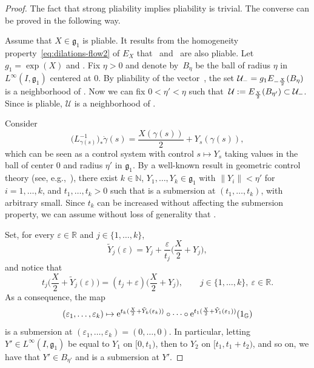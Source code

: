 \documentclass[pdftex]{sigma}
\numberwithin{equation}{section}
\theoremstyle{definition}
\begin{document}
\begin{proof}
 The fact that strong pliability implies pliability is trivial. The converse can be proved in the following way.

Assume that $X\in{\mathfrak g}_1$ is pliable. It results from the homogeneity property~\eqref{eq:dilations-flow2} of $E_X$ that~ and~ are also pliable. Let $g_1=\exp(X)$ and .
Fix $\eta>0$ and denote by~$B_\eta$ be the ball of radius $\eta$ in $L^\infty(I,{\mathfrak g}_1)$ centered at $0$.
By pliability of the vector~, the set
${\mathcal U_-=g_1 \smash{E_{-\frac X2}(B_\eta)}}$ is a neighborhood of .
 Now we can fix $0<\eta'<\eta$ such that~$\mathcal U:=\smash{E_{\frac X2}(B_{\eta'})\subset
 \mathcal U_-}$. Since  is pliable, $\mathcal U$ is a neighborhood of .

 Consider
 \begin{equation*}%
 \bigl(L_{\gamma(s)}^{-1}\bigr)_*\dot\gamma(s)=\frac{X(\gamma(s))}{2}+Y_s(\gamma(s)),
\end{equation*}
 which can be seen as a control system
 with control $s\mapsto Y_s$ taking values in the ball of center $0$ and radius $\eta'$ in ${\mathfrak g}_1$.
 By a well-known result in geometric control theory (see, e.g.,~\cite[Section~3, Theorem~1]{Jurdjevic}),
 there exist $k\in \mathbb{N}$, $Y_1,\dots,Y_k\in {\mathfrak g}_1$ with $\|Y_i\|<\eta'$ for $i=1,\dots,k$, and ${t_1,\dots,t_k>0}$ such that
  is a submersion at $(t_1,\dots,t_k)$, with  arbitrary small. Since $t_k$ can be
 increased without affecting
 the submersion property, we can assume without loss of generality that .

Set, for every $\varepsilon\in \mathbb{R}$ and $j\in\{1,\dots,k\}$,
\[\tilde Y_j(\varepsilon)=Y_j + \frac{\varepsilon}{t_j}\biggl( \frac X2+Y_j\biggr),\]
and notice that
\[t_j\biggl(\frac X2+\tilde Y_j(\varepsilon)\biggr)=(t_j+\varepsilon)\biggl(\frac X2+Y_j\biggr),\qquad j\in\{1,\dots,k\},\ \varepsilon\in \mathbb{R}.\]
As a consequence, the map
\[(\varepsilon_1,\dots,\varepsilon_k)\mapsto {\rm e}^{t_k(\frac X2+\tilde Y_k(\varepsilon_{k}))}\circ \dots \circ {\rm e}^{t_1(\frac X2+\tilde Y_1(\varepsilon_1))}(1_{\mathbb{G}})\]
is a submersion at $(\varepsilon_1,\dots,\varepsilon_k)=(0,\dots,0)$.
In particular, letting $Y'\in L^\infty(I,{\mathfrak g}_1)$
be equal to $Y_1$ on $[0,t_1)$, then to $Y_2$ on $[t_1,t_1+t_2)$, and so on, we have that $Y'\in B_{\eta'}$ and
 is a submersion at $Y'$.


\end{proof}
\end{document}
